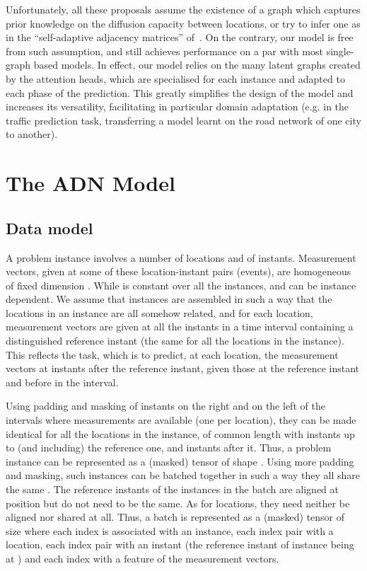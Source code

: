 \documentclass[a4paper]{article}
\begin{document}
Unfortunately, all these proposals assume the existence of a graph which captures prior knowledge on the diffusion capacity between locations, or try to infer one as in the ``self-adaptive adjacency matrices'' of~\cite{wu_graph_2019,kong_stgat_2020}. On the contrary, our model is free from such assumption, and still achieves performance on a par with most single-graph based models. In effect, our model relies on the many latent graphs created by the attention heads, which are specialised for each instance and adapted to each phase of the prediction. This greatly simplifies the design of the model and increases its versatility, facilitating in particular domain adaptation (e.g. in the traffic prediction task, transferring a model learnt on the road network of one city to another).
\section{The ADN Model}
\subsection{Data model}
\label{sec:data-model}
A problem instance involves a number  of locations and  of instants. Measurement vectors, given at some of these location-instant pairs (events), are homogeneous of fixed dimension . While  is constant over all the instances,  and  can be instance dependent. We assume that instances are assembled in such a way that the locations in an instance are all somehow related, and for each location, measurement vectors are given at all the instants in a time interval containing a distinguished reference instant (the same for all the locations in the instance). This reflects the task, which is to predict, at each location, the measurement vectors at instants after the reference instant, given those at the reference instant and before in the interval.

Using padding and masking of instants on the right and on the left of the intervals where measurements are available (one per location), they can be made identical for all the locations in the instance, of common length  with  instants up to (and including) the reference one, and  instants after it. Thus, a problem instance can be represented as a (masked) tensor of shape . Using more padding and masking,  such instances can be batched together in such a way they all share the same . The reference instants of the instances in the batch are aligned at position  but do not need to be the same. As for locations, they need neither be aligned nor shared at all. Thus, a batch is represented as a (masked) tensor of size  where each index  is associated with an instance, each index pair  with a location, each index pair  with an instant (the reference instant of instance  being at ) and each index  with a feature of the measurement vectors.
\end{document}
